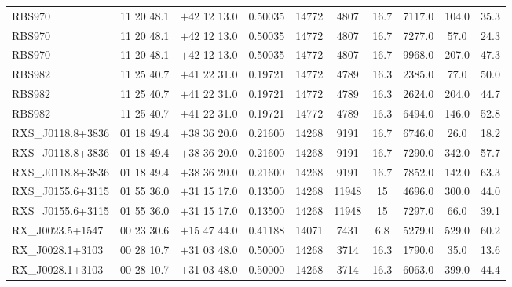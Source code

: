 \begin{landscape}
\begin{center}
\begin{longtable}{l c c c c c c c c c}
RBS970  &                  11 20 48.1  &         $+$42 12 13.0  &       0.50035  & 14772  &   4807  &       16.7  &      7117.0  &  104.0  &  35.3  \\
RBS970  &                  11 20 48.1  &         $+$42 12 13.0  &       0.50035  & 14772  &   4807  &       16.7  &      7277.0  &  57.0  &   24.3  \\
RBS970  &                  11 20 48.1  &         $+$42 12 13.0  &       0.50035  & 14772  &   4807  &       16.7  &      9968.0  &  207.0  &  47.3  \\
RBS982  &                  11 25 40.7  &         $+$41 22 31.0  &       0.19721  & 14772  &   4789  &       16.3  &      2385.0  &  77.0  &   50.0  \\
RBS982  &                  11 25 40.7  &         $+$41 22 31.0  &       0.19721  & 14772  &   4789  &       16.3  &      2624.0  &  204.0  &  44.7  \\
RBS982  &                  11 25 40.7  &         $+$41 22 31.0  &       0.19721  & 14772  &   4789  &       16.3  &      6494.0  &  146.0  &  52.8  \\
RXS\_J0118.8+3836  &       01 18 49.4  &         $+$38 36 20.0  &       0.21600  & 14268  &   9191  &       16.7  &      6746.0  &  26.0  &   18.2  \\
RXS\_J0118.8+3836  &       01 18 49.4  &         $+$38 36 20.0  &       0.21600  & 14268  &   9191  &       16.7  &      7290.0  &  342.0  &  57.7  \\
RXS\_J0118.8+3836  &       01 18 49.4  &         $+$38 36 20.0  &       0.21600  & 14268  &   9191  &       16.7  &      7852.0  &  142.0  &  63.3  \\
RXS\_J0155.6+3115  &       01 55 36.0  &         $+$31 15 17.0  &       0.13500  & 14268  &   11948  &      15  &        4696.0  &  300.0  &  44.0  \\
RXS\_J0155.6+3115  &       01 55 36.0  &         $+$31 15 17.0  &       0.13500  & 14268  &   11948  &      15  &        7297.0  &  66.0  &   39.1  \\
RX\_J0023.5+1547  &        00 23 30.6  &         $+$15 47 44.0  &       0.41188  & 14071  &   7431  &       6.8  &       5279.0  &  529.0  &  60.2  \\
RX\_J0028.1+3103  &        00 28 10.7  &         $+$31 03 48.0  &       0.50000  & 14268  &   3714  &       16.3  &      1790.0  &  35.0  &   13.6  \\
RX\_J0028.1+3103  &        00 28 10.7  &         $+$31 03 48.0  &       0.50000  & 14268  &   3714  &       16.3  &      6063.0  &  399.0  &  44.4  \\

\end{longtable}
\end{center}
\end{landscape}
